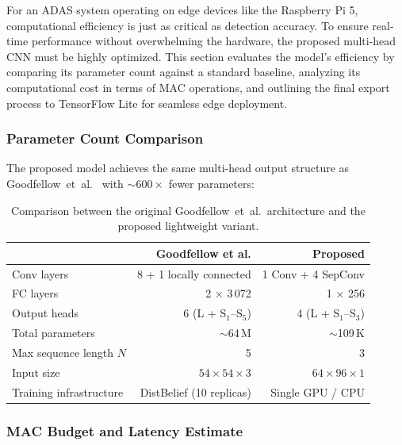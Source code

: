 For an ADAS system operating on edge devices like the Raspberry Pi 5, computational efficiency is just as critical as detection accuracy. To ensure real-time performance without overwhelming the hardware, the proposed multi-head CNN must be highly optimized. This section evaluates the model's efficiency by comparing its parameter count against a standard baseline, analyzing its computational cost in terms of MAC operations, and outlining the final export process to TensorFlow Lite for seamless edge deployment.

\subsubsection{Parameter Count Comparison}

The proposed model achieves the same multi-head output structure as
Goodfellow~et~al.~\cite{goodfellow2014multidigitnumberrecognitionstreet} with
$\sim\!600\times$ fewer parameters:

\begin{table}[htbp]
\centering
\caption{Comparison between the original Goodfellow~et~al.\ architecture
         and the proposed lightweight variant.}
\label{tab:compare}
\renewcommand{\arraystretch}{1.15}
\begin{tabular}{l r r}
\hline
                               & \textbf{Goodfellow et al.}  & \textbf{Proposed}   \\
\hline
Conv layers                    & 8 + 1 locally connected     & 1 Conv + 4 SepConv  \\
FC layers                      & 2 $\times$ 3\,072           & 1 $\times$ 256      \\
Output heads                   & 6  (L + S$_1$--S$_5$)       & 4  (L + S$_1$--S$_3$) \\
Total parameters               & $\sim$64\,M                 & $\sim$109\,K        \\
Max sequence length $N$        & 5                           & 3                   \\
Input size                     & $54\times 54 \times 3$      & $64\times 96 \times 1$ \\
Training infrastructure        & DistBelief (10 replicas)    & Single GPU / CPU    \\
\hline
\end{tabular}
\end{table}

\subsubsection{MAC Budget and Latency Estimate}

